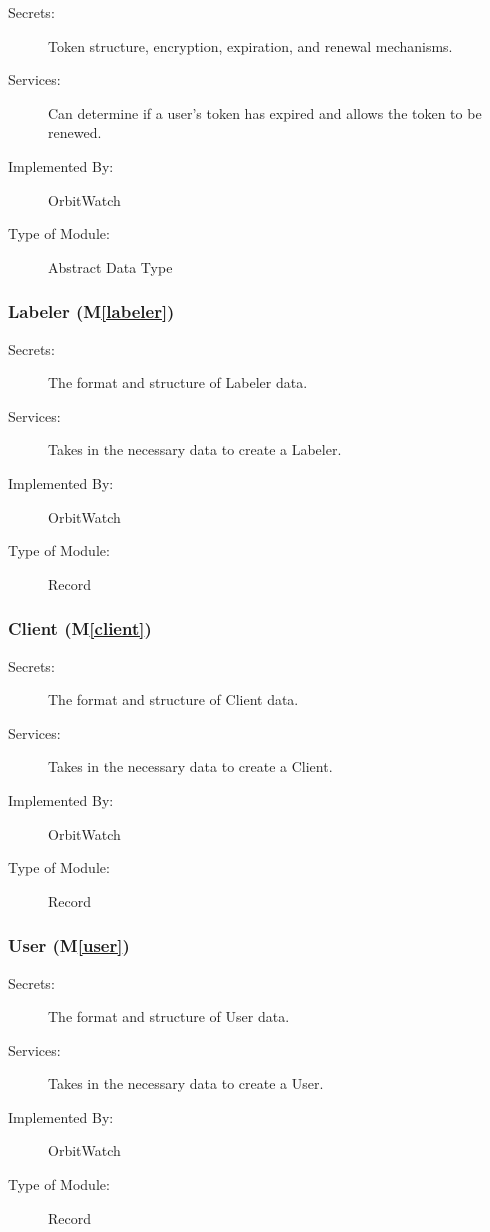 \documentclass[12pt, titlepage]{article}
\newcommand{\mref}[1]{M\ref{#1}}
\begin{document}
\begin{description}
\item[Secrets:] Token structure, encryption, expiration, and renewal mechanisms.
\item[Services:] Can determine if a user's token has expired and allows the token to be renewed.
\item[Implemented By:] OrbitWatch
\item[Type of Module:] Abstract Data Type
\end{description}

\subsubsection{Labeler (\mref{labeler})}

\begin{description}
\item[Secrets:]The format and structure of Labeler data.
\item[Services:] Takes in the necessary data to create a Labeler.
\item[Implemented By:] OrbitWatch
\item[Type of Module:] Record
\end{description}

\subsubsection{Client (\mref{client})}

\begin{description}
\item[Secrets:]The format and structure of Client data.
\item[Services:] Takes in the necessary data to create a Client.
\item[Implemented By:] OrbitWatch
\item[Type of Module:] Record
\end{description}

\subsubsection{User (\mref{user})}

\begin{description}
\item[Secrets:]The format and structure of User data.
\item[Services:] Takes in the necessary data to create a User.
\item[Implemented By:] OrbitWatch
\item[Type of Module:] Record
\end{description}
\end{document}
